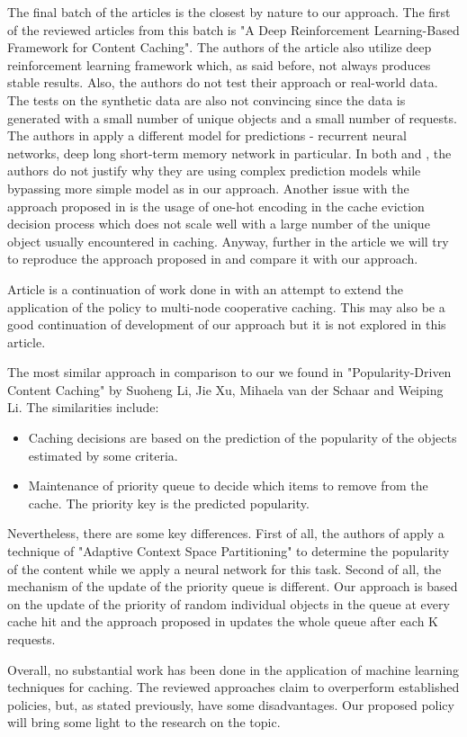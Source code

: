 The final batch of the articles is the closest by nature to our approach. The first of the reviewed articles from this batch is "A Deep Reinforcement Learning-Based Framework for Content Caching"\cite{22}. The authors of the article also utilize deep reinforcement learning framework which, as said before, not always produces stable results. Also, the authors do not test their approach or real-world data. The tests on the synthetic data are also not convincing since the data is generated with a small number of unique objects and a small number of requests. The authors in \cite{23} apply a different model for predictions - recurrent neural networks, deep long short-term memory network in particular. In both \cite{22} and \cite{23}, the authors do not justify why they are using complex prediction models while bypassing more simple model as in our approach. Another issue with the approach proposed in \cite{23} is the usage of one-hot encoding in the cache eviction decision process which does not scale well with a large number of the unique object usually encountered in caching. Anyway, further in the article we will try to reproduce the approach proposed in \cite{23} and compare it with our approach. 

Article \cite{24} is a continuation of work done in \cite{23} with an attempt to extend the application of the policy to multi-node cooperative caching. This may also be a good continuation of development of our approach but it is not explored in this article.


The most similar approach in comparison to our we found in "Popularity-Driven Content Caching" by Suoheng Li, Jie Xu, Mihaela van der Schaar and Weiping Li\cite{25}. The similarities include:
\begin{itemize}
	\item Caching decisions are based on the prediction of the popularity of the objects estimated by some criteria.
	\item Maintenance of priority queue to decide which items to remove from the cache. The priority key is the predicted popularity.
\end{itemize}
Nevertheless, there are some key differences. First of all, the authors of \cite{25} apply a technique of "Adaptive Context Space Partitioning" to determine the popularity of the content while we apply a neural network for this task. Second of all, the mechanism of the update of the priority queue is different. Our approach is based on the update of the priority of random individual objects in the queue at every cache hit and the approach proposed in \cite{25} updates the whole queue after each K requests.

Overall, no substantial work has been done in the application of machine learning techniques for caching. The reviewed approaches claim to overperform established policies, but, as stated previously, have some disadvantages. Our proposed policy will bring some light to the research on the topic.